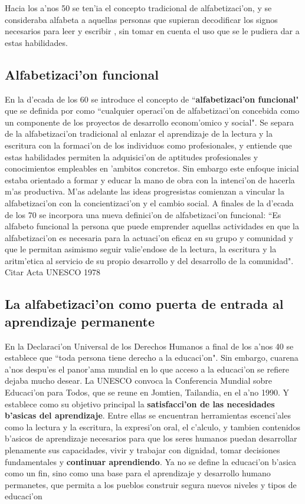Hacia los a'nos 50 se ten'ia el concepto tradicional de alfabetizaci'on, y se consideraba alfabeta 
a aquellas personas que supieran decodificar los signos necesarios para leer y escribir \cite{infante13}, sin tomar en cuenta el uso que se le pudiera dar a estas habilidades.

\subsection{Alfabetizaci'on funcional}
En la d'ecada de los 60 se introduce el concepto de ``\textbf{alfabetizaci'on funcional}" que se definida por \citet{Unesco1970} como ``cualquier operaci'on de alfabetizaci'on concebida como un componente de los proyectos de desarrollo econom'omico y social". Se separa de la alfabetizaci'on tradicional al enlazar el aprendizaje de la lectura y la escritura con la formaci'on de los individuos como profesionales, y entiende que estas habilidades permiten la adquisici'on de aptitudes profesionales y conocimientos empleables en 'ambitos concretos. Sin embargo este enfoque inicial estaba orientado a formar y educar la mano de obra con la intenci'on de hacerla m'as productiva. M'as adelante las ideas progresistas comienzan a vincular la alfabetizaci'on con la concientizaci'on y el cambio social. A finales de la d'ecada de los 70 se incorpora una nueva definici'on de alfabetizaci'on funcional: ``Es alfabeto funcional la persona que puede emprender aquellas actividades en que la alfabetizaci'on es necesaria para la actuaci'on eficaz en su grupo y comunidad y que le permitan asimismo seguir valie'endose de la lectura, la escritura y la aritm'etica al servicio de su propio desarrollo y del desarrollo de la comunidad". {\color{red} Citar Acta UNESCO 1978}

\subsection{La alfabetizaci'on como puerta de entrada al aprendizaje permanente}
En la Declaraci'on Universal de los Derechos Humanos a final de los a'nos 40 se establece que ``toda persona tiene derecho a la educaci'on". Sin embargo, cuarena a'nos despu'es el panor'ama mundial en lo que acceso a la educaci'on se refiere dejaba mucho desear. La UNESCO convoca la Conferencia Mundial sobre Educaci'on para Todos, que se reune en Jomtien, Tailandia, en el a'no 1990. Y establece como su objetivo principal la \textbf{satisfacci'on de las necesidades b'asicas del aprendizaje}. Entre ellas se encuentran herramientas escenci'ales como la lectura y la escritura, la expresi'on oral, el c'alculo, y tambien contenidos b'asicos de aprendizaje necesarios para que los seres humanos puedan desarrollar plenamente sus capacidades, vivir y trabajar con dignidad, tomar decisiones fundamentales y \textbf{continuar aprendiendo}. Ya no se define la educaci'on b'asica como un fin, sino como una base para el aprendizaje y desarrollo humano permanetes, que permita a los pueblos construir segura nuevos niveles y tipos de educaci'on \cite{Unesco1990}

